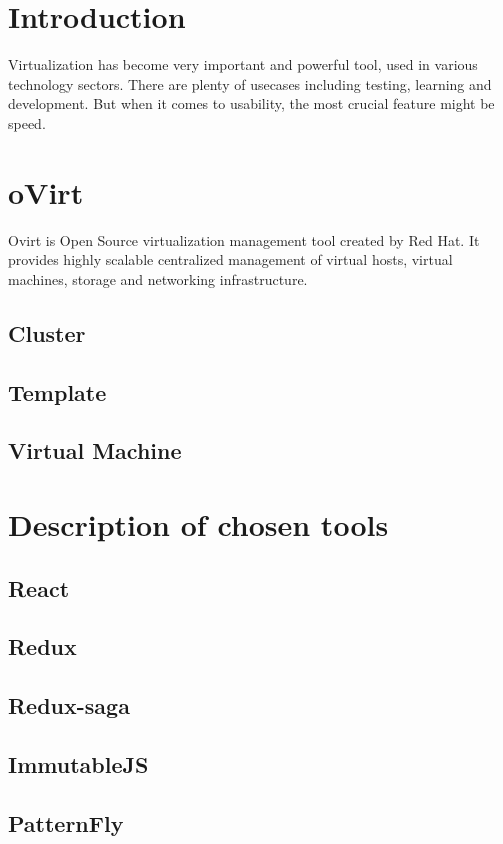 \chapter{Introduction}
Virtualization has become very important and powerful tool, used in various technology sectors. There are plenty of usecases including testing, learning and development. But when it comes to usability, the most crucial feature might be speed.

\chapter{oVirt}
Ovirt is Open Source virtualization management tool created by Red Hat. It provides highly scalable centralized management of virtual hosts, virtual machines, storage and networking infrastructure.

\section{Cluster}
\section{Template}
\section{Virtual Machine}

\chapter{Description of chosen tools}

\section{React}
\section{Redux}
\section{Redux-saga}
\section{ImmutableJS}
\section{PatternFly}

